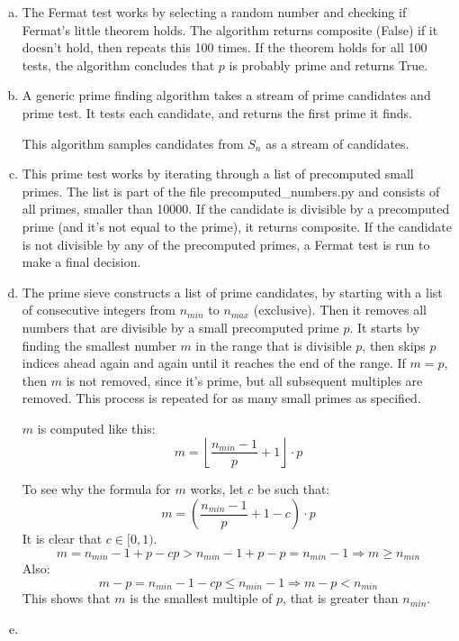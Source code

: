 \documentclass[12pt,a4paper]{article}
\begin{document}
\begin{enumerate}[a)]
    \setlength{\itemsep}{10pt}
    \item
    The Fermat test works by selecting a random number and checking if Fermat's little theorem holds.
    The algorithm returns composite (False) if it doesn't hold, then repeats this 100 times.
    If the theorem holds for all 100 tests, the algorithm concludes that \(p\) is probably prime and returns True.
    \vspace{20pt}
    
    \item
    A generic prime finding algorithm takes a stream of prime candidates and prime test.
    It tests each candidate, and returns the first prime it finds.
    
    \vspace{20pt}
    This algorithm samples candidates from \(S_n\) as a stream of candidates.
    
    \item
    This prime test works by iterating through a list of precomputed small primes.
    The list is part of the file precomputed\_numbers.py and consists of all primes, smaller than 10000.
    If the candidate is divisible by a precomputed prime (and it's not equal to the prime), it returns composite.
    If the candidate is not divisible by any of the precomputed primes, a Fermat test is run to make a final decision.
    
    \item
    The prime sieve constructs a list of prime candidates, by starting with a list of consecutive integers from
    \(n_{min}\) to \(n_{max}\) (exclusive).
    Then it removes all numbers that are divisible by a small precomputed prime \(p\).
    It starts by finding the smallest number \(m\) in the range that is divisible \(p\), then skips \(p\) indices ahead
    again and again until it reaches the end of the range.
    If \(m = p\), then \(m\) is not removed, since it's prime, but all subsequent multiples are removed.
    This process is repeated for as many small primes as specified.

    \(m\) is computed like this:
    \[m = \left\lfloor \frac{n_{min}-1}{p} + 1 \right\rfloor \cdot p\]
    
    To see why the formula for \(m\) works, let \(c\) be such that:
    \[m = \left( \frac{n_{min}-1}{p} + 1 - c \right) \cdot p\]
    It is clear that \(c \in [0, 1)\).
    \[m = n_{min} - 1 + p - cp > n_{min} - 1 + p - p = n_{min} - 1 \Rightarrow m \geq n_{min}\]
    Also:
    \[m - p = n_{min} - 1 - cp \leq n_{min} - 1 \Rightarrow m - p < n_{min}\]
    This shows that \(m\) is the smallest multiple of \(p\), that is greater than \(n_{min}\).

    \item


\end{enumerate}
\end{document}
